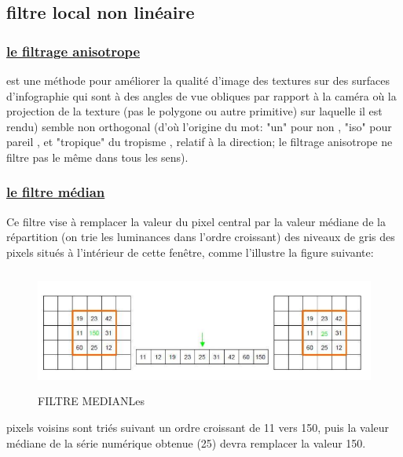 \documentclass[12pt,a4paper]{report}
\numberwithin{equation}{subsection}
\numberwithin{equation}{section}
\begin{document}
\subsection{filtre local non linéaire}
\subsubsection{\underline{le filtrage anisotrope}}
est une méthode pour améliorer la qualité d'image des textures sur des surfaces d'infographie qui sont à des angles de vue obliques par rapport à la caméra où la projection de la texture (pas le polygone ou autre primitive) sur laquelle il est rendu) semble non orthogonal (d'où l'origine du mot: "un" pour non , "iso" pour pareil , et "tropique" du tropisme , relatif à la direction; le filtrage anisotrope ne filtre pas le même dans tous les sens).
\subsubsection{\underline{ le filtre médian}}
Ce filtre vise à remplacer la valeur du pixel central par la valeur médiane de la répartition (on trie les luminances dans l'ordre croissant) des niveaux de gris des pixels situés à l'intérieur de cette fenêtre, comme l’illustre la figure
suivante:\newline
\begin{figure}[!h]
    \centering
    \includegraphics[height=4cm , width=.5\textwidth]{median1.png}
    \caption{FILTRE MEDIANLes}
\end{figure}
\newline
\newline
\newline
\newline
\newline
\newline
\newline
\newline
 pixels voisins sont triés suivant un ordre croissant de 11 vers 150, puis la valeur médiane
de la série numérique obtenue (25) devra remplacer la valeur 150.
\end{document}
